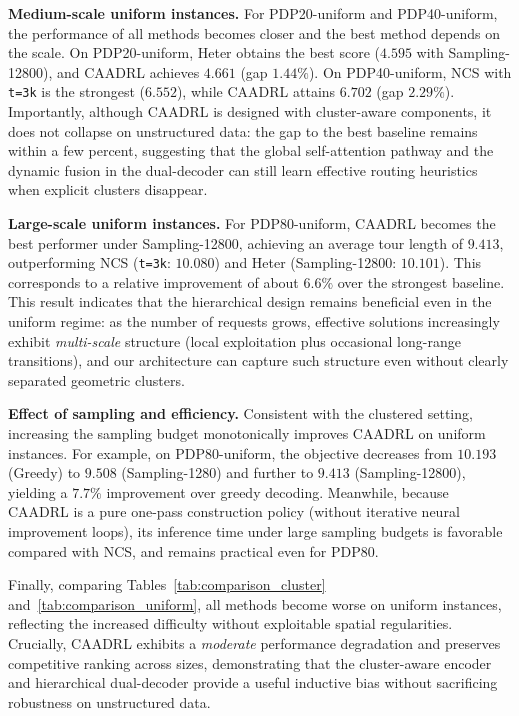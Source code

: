 \documentclass[pdflatex,sn-basic,Numbered]{sn-jnl}
\begin{document}
\textbf{Medium-scale uniform instances.}
For PDP20-uniform and PDP40-uniform, the performance of all methods becomes closer and the best method depends on the scale. On PDP20-uniform, Heter obtains the best score ($4.595$ with Sampling-12800), and CAADRL achieves $4.661$ (gap $1.44\%$). On PDP40-uniform, NCS with \texttt{t=3k} is the strongest ($6.552$), while CAADRL attains $6.702$ (gap $2.29\%$). Importantly, although CAADRL is designed with cluster-aware components, it does not collapse on unstructured data: the gap to the best baseline remains within a few percent, suggesting that the global self-attention pathway and the dynamic fusion in the dual-decoder can still learn effective routing heuristics when explicit clusters disappear.

\textbf{Large-scale uniform instances.}
For PDP80-uniform, CAADRL becomes the best performer under Sampling-12800, achieving an average tour length of $9.413$, outperforming NCS (\texttt{t=3k}: $10.080$) and Heter (Sampling-12800: $10.101$). This corresponds to a relative improvement of about $6.6\%$ over the strongest baseline. This result indicates that the hierarchical design remains beneficial even in the uniform regime: as the number of requests grows, effective solutions increasingly exhibit \emph{multi-scale} structure (local exploitation plus occasional long-range transitions), and our architecture can capture such structure even without clearly separated geometric clusters.

\textbf{Effect of sampling and efficiency.}
Consistent with the clustered setting, increasing the sampling budget monotonically improves CAADRL on uniform instances. For example, on PDP80-uniform, the objective decreases from $10.193$ (Greedy) to $9.508$ (Sampling-1280) and further to $9.413$ (Sampling-12800), yielding a $7.7\%$ improvement over greedy decoding. Meanwhile, because CAADRL is a pure one-pass construction policy (without iterative neural improvement loops), its inference time under large sampling budgets is favorable compared with NCS, and remains practical even for PDP80.


Finally, comparing Tables~\ref{tab:comparison_cluster} and~\ref{tab:comparison_uniform}, all methods become worse on uniform instances, reflecting the increased difficulty without exploitable spatial regularities. Crucially, CAADRL exhibits a \emph{moderate} performance degradation and preserves competitive ranking across sizes, demonstrating that the cluster-aware encoder and hierarchical dual-decoder provide a useful inductive bias without sacrificing robustness on unstructured data.
\end{document}
